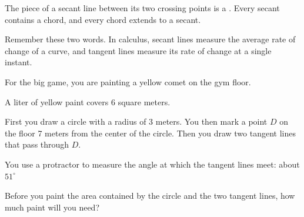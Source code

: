 The piece of a secant line between its two crossing points is a
. Every secant contains a chord, and every chord
extends to a secant.

Remember these two words. In calculus, secant lines measure the average rate
of change of a curve, and tangent lines measure its rate of change at a
single instant.


\begin{Exercise}[title={Painting a Comet}, label=painting_comet]
  
  For the big game, you are painting a yellow comet on the gym floor.

  A liter of yellow paint covers 6 square meters.

  First you draw a circle with a radius of 3 meters.  You then mark a
  point $D$ on the floor 7 meters from the center of the circle.  Then
  you draw two tangent lines that pass through $D$.

  You use a protractor to measure the angle at which the tangent lines meet: about 
  $51^\circ$
  

  Before you paint the area contained by the circle and the two
  tangent lines, how much paint will you need?
    

\end{Exercise}
